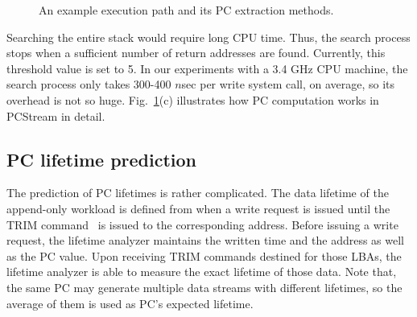 \begin{figure}[b]
	\vspace{-15pt}
	\centering
	\vspace{-10pt}
	\hfill
	\vspace{-8pt}
	\caption{An example execution path and its PC extraction methods.}
	\label{fig:getpc}
\end{figure}

Searching the entire stack would require long CPU time. Thus, the
search process stops when a sufficient number of return addresses are found.
Currently, this threshold value is set to 5.  In our experiments
with a 3.4 GHz CPU machine, the search process only takes 300-400 $n$sec per
write system call, on average, so its overhead is not so huge.
Fig.~\ref{fig:getpc}(c) illustrates how PC computation works in {\sf PCStream}
in detail.




\vspace{-5pt}
\subsection{PC lifetime prediction}
The prediction of PC lifetimes is rather complicated. 
The data lifetime of the append-only workload is defined 
from when a write request is issued until the TRIM command~\cite{TRIM} is issued to 
the corresponding address.
Before issuing a write request, the lifetime analyzer
maintains the written time and the address as well as the PC value.
Upon receiving TRIM
commands destined for those LBAs, the lifetime analyzer is able to measure the
exact lifetime of those data. 
Note that, the
same PC may generate multiple data streams with different lifetimes, 
so the average of them is used as PC's expected lifetime.


